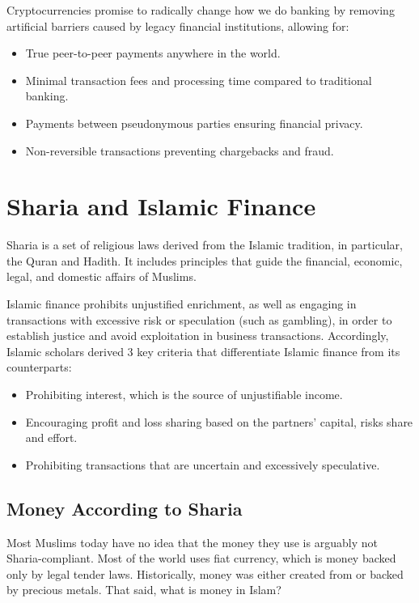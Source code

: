 \documentclass[letterpaper,11pt]{article}
\begin{document}
Cryptocurrencies promise to radically change how we do banking by removing artificial barriers caused by legacy financial institutions, allowing for:

\begin{itemize}
	\item True peer-to-peer payments anywhere in the world.
	\item Minimal transaction fees and processing time compared to traditional banking.
	\item Payments between pseudonymous parties ensuring financial privacy.
	\item Non-reversible transactions preventing chargebacks and fraud.
\end{itemize}

\section{Sharia and Islamic Finance}

Sharia is a set of religious laws derived from the Islamic tradition, in particular, the Quran and Hadith. It includes principles that guide the financial, economic, legal, and domestic affairs of Muslims.

Islamic finance prohibits unjustified enrichment, as well as engaging in transactions with excessive risk or speculation (such as gambling), in order to establish justice and avoid exploitation in business transactions.
Accordingly, Islamic scholars derived 3 key criteria that differentiate Islamic finance from its counterparts:


\begin{itemize}
	\item Prohibiting interest, which is the source of unjustifiable income.
	\item Encouraging profit and loss sharing based on the partners’ capital, risks share and effort.
	\item Prohibiting transactions that are uncertain and excessively speculative.
\end{itemize}

\subsection{Money According to Sharia}

Most Muslims today have no idea that the money they use is arguably not Sharia-compliant. Most of the world uses fiat currency, which is money backed only by legal tender laws. Historically, money was either created from or backed by precious metals. That said, what is money in Islam?
\end{document}
